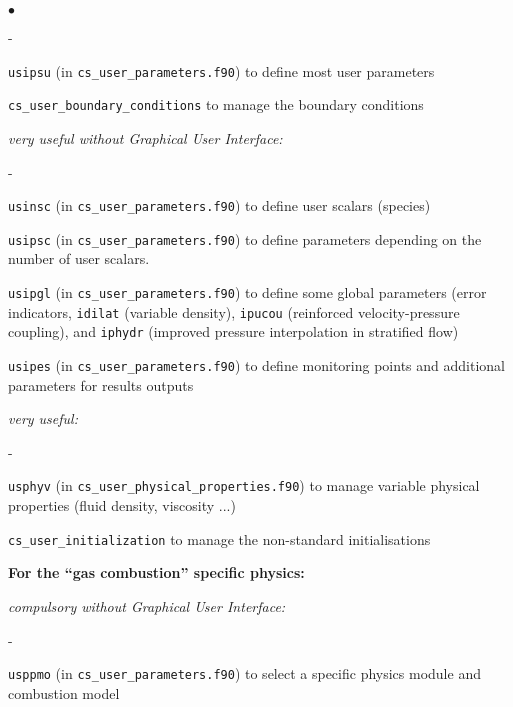 {{{\begin{list}{$\bullet$}{}
\begin{list}{}{}
\begin{list}{}{}
\begin{list}{-}{}
            \item \texttt{usipsu} (in \texttt{cs\_user\_parameters.f90}) to
              define most user parameters

            \item \texttt{cs\_user\_boundary\_conditions} to manage the boundary conditions
        \end{list}

        \item {\em  very useful without Graphical User Interface:}
        \begin{list}{-}{}
            \item \texttt{usinsc} (in \texttt{cs\_user\_parameters.f90}) to
              define user scalars (species)

            \item \texttt{usipsc} (in \texttt{cs\_user\_parameters.f90}) to
              define parameters depending on the number of user scalars.

            \item \texttt{usipgl} (in \texttt{cs\_user\_parameters.f90}) to
              define some global parameters (error indicators, \texttt{idilat}
              (variable density), \texttt{ipucou} (reinforced velocity-pressure
              coupling), and \texttt{iphydr} (improved pressure interpolation in
              stratified flow)

            \item \texttt{usipes} (in \texttt{cs\_user\_parameters.f90}) to
              define monitoring points and additional parameters for results outputs
        \end{list}

        \item {\em  very useful:}
        \begin{list}{-}{}
            \item \texttt{usphyv} (in
              \texttt{cs\_user\_physical\_properties.f90}) to manage variable physical
                  properties (fluid density, viscosity ...)

            \item \texttt{cs\_user\_initialization} to manage the non-standard initialisations
        \end{list}
    \end{list}

  \item{\bf For the ``gas combustion'' specific physics:}

    \begin{list}{}{}
        \item {\em compulsory without Graphical User Interface:}
        \begin{list}{-}{}
            \item \texttt{usppmo} (in \texttt{cs\_user\_parameters.f90}) 
               to select a specific physics module and combustion model
        \end{list}


\end{list}
\end{list}
\end{list}}}}
